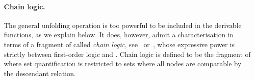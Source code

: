 
\paragraph*{Chain logic.}
The general unfolding operation is too powerful  to be included in the derivable functions, as we explain below. It does, however, admit a characterisation in terms of a fragment of \mso called \emph{chain logic},  see~\cite[Section 2]{thomas1992} or~\cite[Section 2.5.3]{bojanczykDecidablePropertiesTree2004}, whose expressive power is strictly between first-order logic and \mso. Chain logic is defined to be the fragment of  \mso where set quantification is restricted to sets  where all nodes are comparable by  the descendant relation. 

